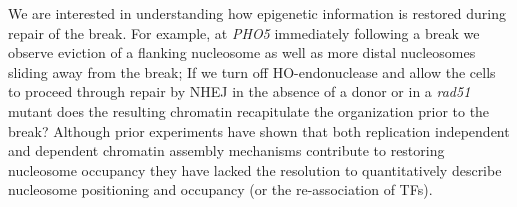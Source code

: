 We are interested in understanding how epigenetic information is restored during repair of the break. %
For example, at \textit{PHO5} immediately following a break we observe eviction of a flanking nucleosome as well as more distal nucleosomes sliding away from the break; 
If we turn off HO-endonuclease and 
allow the cells to proceed through repair by NHEJ in the absence of a donor or in a \textit{rad51} mutant does the resulting chromatin recapitulate the organization prior to the break? Although prior experiments have shown that both replication independent and dependent chromatin assembly mechanisms contribute to restoring nucleosome occupancy\citep{Li2016}
they have lacked the resolution to quantitatively describe nucleosome positioning and occupancy (or the re-association of TFs).
  
